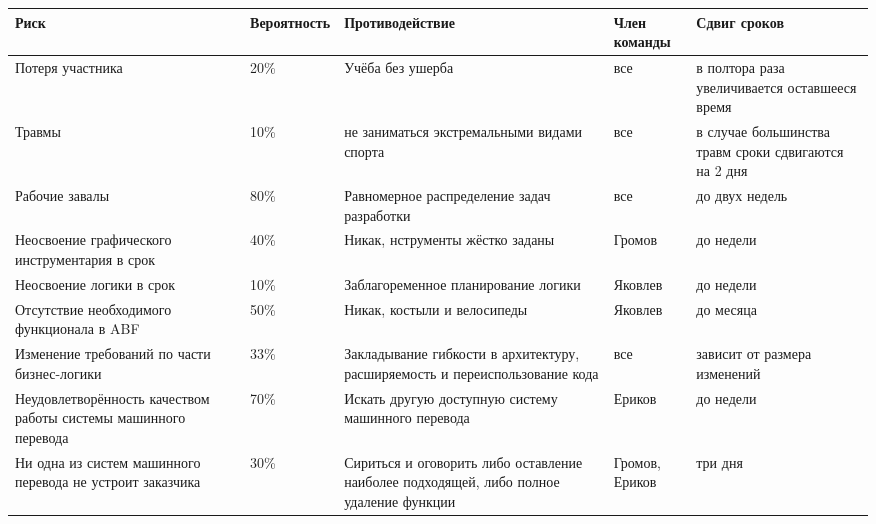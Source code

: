 \documentclass[12p]{article}
\author{Дмитрий Яковлев}
\begin{document}
	\begin{tabular}{| p{4cm} | l | p{5cm} | l | p{4cm} | }
		\hline
		Риск & Вероятность & Противодействие & Член команды & Сдвиг сроков \\ \hline
		Потеря участника & 20\% & Учёба без ушерба & все & в полтора раза увеличивается оставшееся время \\ \hline
		Травмы & 10\% & не заниматься экстремальными видами спорта & все & в случае большинства травм сроки сдвигаются на 2 дня \\ \hline
		Рабочие завалы & 80\% & Равномерное распределение задач разработки & все & до двух недель \\ \hline
		Неосвоение графического инструментария в срок & 40\% & Никак, нструменты жёстко заданы & Громов & до недели \\ \hline
		Неосвоение логики в срок & 10\% & Заблагоременное планирование логики & Яковлев & до недели \\ \hline
		Отсутствие необходимого функционала в ABF & 50\% & Никак, костыли и велосипеды & Яковлев & до месяца \\ \hline
		Изменение требований по части бизнес-логики & 33\% & Закладывание гибкости в архитектуру, расширяемость и переиспользование кода & все & зависит от размера изменений \\ \hline
		Неудовлетворённость качеством работы системы машинного перевода & 70\% & Искать другую доступную систему машинного перевода & Ериков & до недели \\ \hline
		Ни одна из систем машинного перевода не устроит заказчика & 30\% & Сириться и оговорить либо оставление наиболее подходящей, либо полное удаление функции & Громов, Ериков & три дня \\ \hline  
	\end{tabular}
\end{document}
